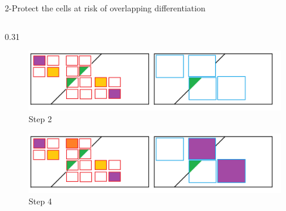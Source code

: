 \documentclass[final,xcolor={dvipsnames,svgnames,table}]{beamer}
\newlength{\colwidth}
\begin{document}
\begin{frame}[fragile,t]
\begin{columns}[t]
\begin{column}{\colwidth}
\begin{block}{2-Protect the cells at risk of overlapping differentiation}
\begin{columns}
\begin{column}{0.31\colwidth}
        \vspace{-1cm}
        \setcounter{figure}{6}
        \begin{figure}
            \centering
            \caption{\footnotesize Step 2}
            \vspace{-1cm}
            \includegraphics[scale=0.35]{Images/test_articulation_4.png}
        \end{figure}
        \vspace{-1cm}
        \setcounter{figure}{8}
        \begin{figure}
            \centering
            \caption{\footnotesize Step 4}
             \vspace{-1cm}
            \includegraphics[scale=0.35]{Images/test_articulation_6.png}
        \end{figure}
        
    \end{column}
       
    \end{columns}   


  \end{block}


    



\end{column}
\end{columns}
\end{frame}
\end{document}
